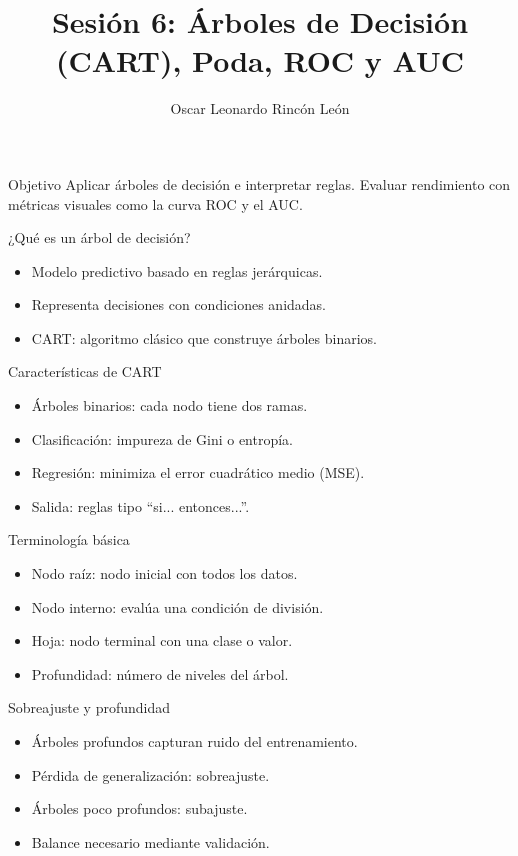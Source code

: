 \documentclass{beamer}
\title{Sesión 6: Árboles de Decisión (CART), Poda, ROC y AUC}
\author{Oscar Leonardo Rincón León }
\date{}
\begin{document}
\frame{\titlepage}

\begin{frame}{Objetivo}
Aplicar árboles de decisión e interpretar reglas. Evaluar rendimiento con métricas visuales como la curva ROC y el AUC.
\end{frame}

\begin{frame}{¿Qué es un árbol de decisión?}
\begin{itemize}
    \item Modelo predictivo basado en reglas jerárquicas.
    \item Representa decisiones con condiciones anidadas.
    \item CART: algoritmo clásico que construye árboles binarios.
\end{itemize}
\end{frame}

\begin{frame}{Características de CART}
\begin{itemize}
    \item Árboles binarios: cada nodo tiene dos ramas.
    \item Clasificación: impureza de Gini o entropía.
    \item Regresión: minimiza el error cuadrático medio (MSE).
    \item Salida: reglas tipo “si... entonces...”.
\end{itemize}
\end{frame}

\begin{frame}{Terminología básica}
\begin{itemize}
    \item Nodo raíz: nodo inicial con todos los datos.
    \item Nodo interno: evalúa una condición de división.
    \item Hoja: nodo terminal con una clase o valor.
    \item Profundidad: número de niveles del árbol.
\end{itemize}
\end{frame}

\begin{frame}{Sobreajuste y profundidad}
\begin{itemize}
    \item Árboles profundos capturan ruido del entrenamiento.
    \item Pérdida de generalización: sobreajuste.
    \item Árboles poco profundos: subajuste.
    \item Balance necesario mediante validación.
\end{itemize}
\end{frame}
\end{document}
